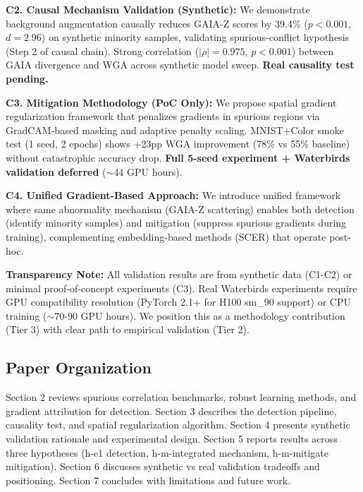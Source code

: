 \textbf{C2. Causal Mechanism Validation (Synthetic):} We demonstrate background augmentation causally reduces GAIA-Z scores by 39.4\% ($p<0.001$, $d=2.96$) on synthetic minority samples, validating spurious-conflict hypothesis (Step 2 of causal chain). Strong correlation ($|\rho|=0.975$, $p<0.001$) between GAIA divergence and WGA across synthetic model sweep. \textbf{Real causality test pending.}

\textbf{C3. Mitigation Methodology (PoC Only):} We propose spatial gradient regularization framework that penalizes gradients in spurious regions via GradCAM-based masking and adaptive penalty scaling. MNIST+Color smoke test (1 seed, 2 epochs) shows +23pp WGA improvement (78\% vs 55\% baseline) without catastrophic accuracy drop. \textbf{Full 5-seed experiment + Waterbirds validation deferred} ($\sim$44 GPU hours).

\textbf{C4. Unified Gradient-Based Approach:} We introduce unified framework where same abnormality mechanism (GAIA-Z scattering) enables both detection (identify minority samples) and mitigation (suppress spurious gradients during training), complementing embedding-based methods (SCER) that operate post-hoc.

\textbf{Transparency Note:} All validation results are from synthetic data (C1-C2) or minimal proof-of-concept experiments (C3). Real Waterbirds experiments require GPU compatibility resolution (PyTorch 2.1+ for H100 sm\_90 support) or CPU training ($\sim$70-90 GPU hours). We position this as a methodology contribution (Tier 3) with clear path to empirical validation (Tier 2).

\subsection{Paper Organization}

Section 2 reviews spurious correlation benchmarks, robust learning methods, and gradient attribution for detection. Section 3 describes the detection pipeline, causality test, and spatial regularization algorithm. Section 4 presents synthetic validation rationale and experimental design. Section 5 reports results across three hypotheses (h-e1 detection, h-m-integrated mechanism, h-m-mitigate mitigation). Section 6 discusses synthetic vs real validation tradeoffs and positioning. Section 7 concludes with limitations and future work.
